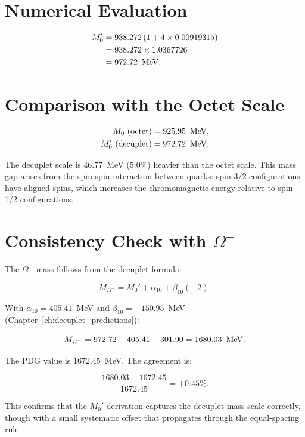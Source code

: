 \section{Numerical Evaluation}

\[
\begin{aligned}
M_0' &= 938.272\,(1 + 4 \times 0.00919315) \\
     &= 938.272 \times 1.0367726 \\
     &= 972.72\ \,\text{MeV}.
\end{aligned}
\]

\section{Comparison with the Octet Scale}

\[
\begin{aligned}
M_0\ (\text{octet}) &= 925.95\ \,\text{MeV}, \\
M_0'\ (\text{decuplet}) &= 972.72\ \,\text{MeV}.
\end{aligned}
\]

The decuplet scale is \(46.77\)~MeV (\(5.0\%\)) heavier than the octet
scale.  This mass gap arises from the spin-spin interaction between
quarks: spin-3/2 configurations have aligned spins, which increases the
chromomagnetic energy relative to spin-1/2 configurations.

\section{Consistency Check with \(\Omega^-\)}

The \(\Omega^-\) mass follows from the decuplet formula:

\[
M_{\Omega^-} = M_0' + \alpha_{10} + \beta_{10}(-2).
\]

With \(\alpha_{10} = 405.41\)~MeV and \(\beta_{10} = -150.95\)~MeV
(Chapter~\ref{ch:decuplet_predictions}):

\[
M_{\Omega^-} = 972.72 + 405.41 + 301.90 = 1680.03\ \,\text{MeV}.
\]

The PDG value is \(1672.45\)~MeV.  The agreement is:

\[
\frac{1680.03 - 1672.45}{1672.45} = +0.45\%.
\]

This confirms that the \(M_0'\) derivation captures the decuplet mass scale
correctly, though with a small systematic offset that propagates through
the equal-spacing rule.
